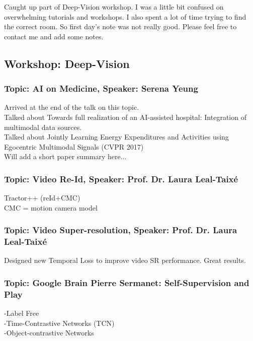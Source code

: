 Caught up part of Deep-Vision workshop. I was a little bit confused on overwhelming tutorials and workshops. I also spent a lot of time trying to find the correct room. So first day's note was not really good. Please feel free to contact me and add some notes.

\subsection{Workshop: Deep-Vision}
\subsubsection{Topic: AI on Medicine, Speaker: Serena Yeung}
Arrived at the end of the talk on this topic. \\
Talked about Towards full realization of an AI-assisted hospital: Integration of multimodal data sources. \\
Talked about Jointly Learning Energy Expenditures and Activities using Egocentric Multimodal Signals (CVPR 2017) \\
Will add a short paper summary here... \\

\subsubsection{Topic: Video Re-Id, Speaker: Prof. Dr. Laura Leal-Taixé}
Tractor++ (reId+CMC)\\
CMC = motion camera model
\subsubsection{Topic: Video Super-resolution, Speaker: Prof. Dr. Laura Leal-Taixé}
Designed new Temporal Loss to improve video SR performance. Great results.
\subsubsection{Topic: Google Brain Pierre Sermanet: Self-Supervision and Play}
-Label Free\\
-Time-Contrastive Networks (TCN)\\
-Object-contrastive Networks\\

